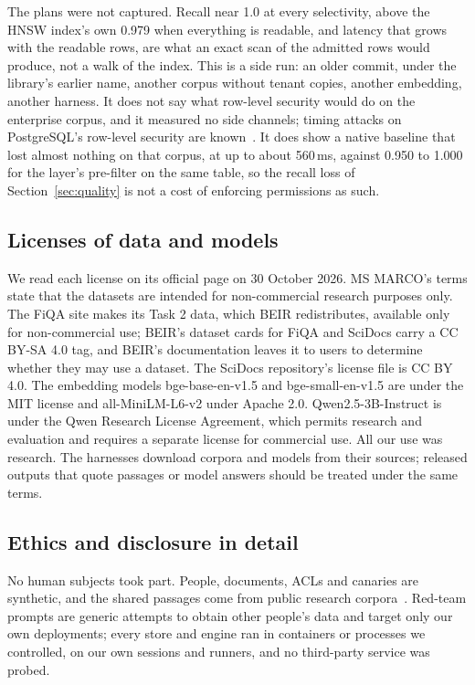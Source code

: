 The plans were not captured. Recall near 1.0 at every selectivity, above the HNSW index's own 0.979 when everything is readable, and latency that grows with the readable rows, are what an exact scan of the admitted rows would produce, not a walk of the index. This is a side run: an older commit, under the library's earlier name, another corpus without tenant copies, another embedding, another harness. It does not say what row-level security would do on the enterprise corpus, and it measured no side channels; timing attacks on PostgreSQL's row-level security are known~\cite{dar2023rls,rasin2024vulnerability,espiritu2026plaintext}. It does show a native baseline that lost almost nothing on that corpus, at up to about 560\,ms, against 0.950 to 1.000 for the layer's pre-filter on the same table, so the recall loss of Section~\ref{sec:quality} is not a cost of enforcing permissions as such.

\subsection{Licenses of data and models}\label{app:licenses}

We read each license on its official page on 30 October 2026. MS MARCO's terms state that the datasets
are intended for non-commercial research purposes only. The FiQA site makes its Task 2 data, which
BEIR redistributes, available only for non-commercial use; BEIR's dataset cards for FiQA and SciDocs
carry a CC BY-SA 4.0 tag, and BEIR's documentation leaves it to users to determine whether they may use
a dataset. The SciDocs repository's license file is CC BY 4.0. The embedding models bge-base-en-v1.5 and
bge-small-en-v1.5 are under the MIT license and all-MiniLM-L6-v2 under Apache 2.0. Qwen2.5-3B-Instruct
is under the Qwen Research License Agreement, which permits research and evaluation and requires a
separate license for commercial use. All our use was research. The harnesses download corpora and
models from their sources; released outputs that quote passages or model answers should be treated
under the same terms.

\subsection{Ethics and disclosure in detail}\label{app:ethics}

No human subjects took part. People, documents, ACLs and canaries are synthetic, and the shared
passages come from public research corpora~\cite{maia2018www18,bajaj2016ms}. Red-team prompts are
generic attempts to obtain other people's data and target only our own deployments; every store and
engine ran in containers or processes we controlled, on our own sessions and runners, and no
third-party service was probed.

